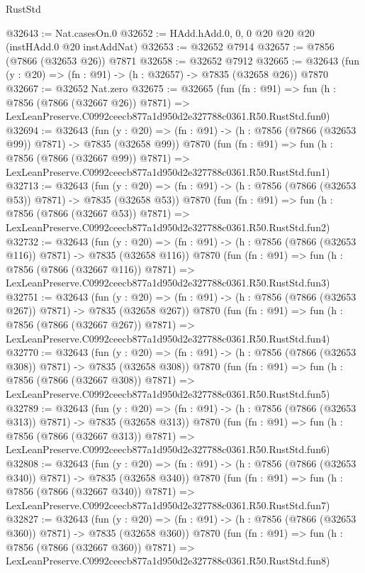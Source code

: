 \begin{lexlean}{RustStd}
\begin{coremodule}
@32643 := Nat.casesOn.{0}
@32652 := HAdd.hAdd.{0, 0, 0} @20 @20 @20 (instHAdd.{0} @20 instAddNat)
@32653 := @32652 @7914
@32657 := @7856 (@7866 (@32653 @26)) @7871
@32658 := @32652 @7912
@32665 := @32643 (fun (y : @20) => (fn : @91) -> (h : @32657) -> @7835 (@32658 @26)) @7870
@32667 := @32652 Nat.zero
@32675 := @32665
    (fun (fn : @91) =>
    fun (h : @7856 (@7866 (@32667 @26)) @7871) =>
    LexLeanPreserve.C0992ceecb877a1d950d2e327788c0361.R50.RustStd.fun0)
@32694 := @32643
    (fun (y : @20) => (fn : @91) -> (h : @7856 (@7866 (@32653 @99)) @7871) -> @7835 (@32658 @99))
    @7870
    (fun (fn : @91) =>
    fun (h : @7856 (@7866 (@32667 @99)) @7871) =>
    LexLeanPreserve.C0992ceecb877a1d950d2e327788c0361.R50.RustStd.fun1)
@32713 := @32643
    (fun (y : @20) => (fn : @91) -> (h : @7856 (@7866 (@32653 @53)) @7871) -> @7835 (@32658 @53))
    @7870
    (fun (fn : @91) =>
    fun (h : @7856 (@7866 (@32667 @53)) @7871) =>
    LexLeanPreserve.C0992ceecb877a1d950d2e327788c0361.R50.RustStd.fun2)
@32732 := @32643
    (fun (y : @20) => (fn : @91) -> (h : @7856 (@7866 (@32653 @116)) @7871) -> @7835 (@32658 @116))
    @7870
    (fun (fn : @91) =>
    fun (h : @7856 (@7866 (@32667 @116)) @7871) =>
    LexLeanPreserve.C0992ceecb877a1d950d2e327788c0361.R50.RustStd.fun3)
@32751 := @32643
    (fun (y : @20) => (fn : @91) -> (h : @7856 (@7866 (@32653 @267)) @7871) -> @7835 (@32658 @267))
    @7870
    (fun (fn : @91) =>
    fun (h : @7856 (@7866 (@32667 @267)) @7871) =>
    LexLeanPreserve.C0992ceecb877a1d950d2e327788c0361.R50.RustStd.fun4)
@32770 := @32643
    (fun (y : @20) => (fn : @91) -> (h : @7856 (@7866 (@32653 @308)) @7871) -> @7835 (@32658 @308))
    @7870
    (fun (fn : @91) =>
    fun (h : @7856 (@7866 (@32667 @308)) @7871) =>
    LexLeanPreserve.C0992ceecb877a1d950d2e327788c0361.R50.RustStd.fun5)
@32789 := @32643
    (fun (y : @20) => (fn : @91) -> (h : @7856 (@7866 (@32653 @313)) @7871) -> @7835 (@32658 @313))
    @7870
    (fun (fn : @91) =>
    fun (h : @7856 (@7866 (@32667 @313)) @7871) =>
    LexLeanPreserve.C0992ceecb877a1d950d2e327788c0361.R50.RustStd.fun6)
@32808 := @32643
    (fun (y : @20) => (fn : @91) -> (h : @7856 (@7866 (@32653 @340)) @7871) -> @7835 (@32658 @340))
    @7870
    (fun (fn : @91) =>
    fun (h : @7856 (@7866 (@32667 @340)) @7871) =>
    LexLeanPreserve.C0992ceecb877a1d950d2e327788c0361.R50.RustStd.fun7)
@32827 := @32643
    (fun (y : @20) => (fn : @91) -> (h : @7856 (@7866 (@32653 @360)) @7871) -> @7835 (@32658 @360))
    @7870
    (fun (fn : @91) =>
    fun (h : @7856 (@7866 (@32667 @360)) @7871) =>
    LexLeanPreserve.C0992ceecb877a1d950d2e327788c0361.R50.RustStd.fun8)

\end{coremodule}
\end{lexlean}
